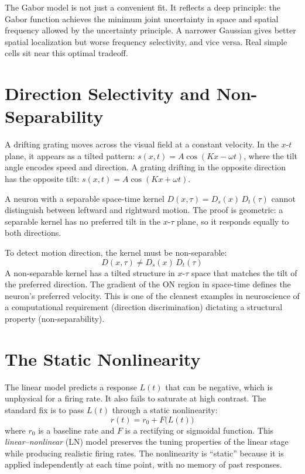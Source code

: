 The Gabor model is not just a convenient fit. It reflects a deep principle: the Gabor function achieves the minimum joint uncertainty in space and spatial frequency allowed by the uncertainty principle. A narrower Gaussian gives better spatial localization but worse frequency selectivity, and vice versa. Real simple cells sit near this optimal tradeoff.

\section{Direction Selectivity and Non-Separability}
\label{sec:direction}

A drifting grating moves across the visual field at a constant velocity. In the $x$-$t$ plane, it appears as a tilted pattern: $s(x, t) = A\cos(Kx - \omega t)$, where the tilt angle encodes speed and direction. A grating drifting in the opposite direction has the opposite tilt: $s(x, t) = A\cos(Kx + \omega t)$.

A neuron with a separable space-time kernel $D(x, \tau) = D_s(x)\,D_t(\tau)$ cannot distinguish between leftward and rightward motion. The proof is geometric: a separable kernel has no preferred tilt in the $x$-$\tau$ plane, so it responds equally to both directions.

To detect motion direction, the kernel must be non-separable:
%
\begin{equation}
  D(x, \tau) \neq D_s(x)\,D_t(\tau)
  \label{eq:non-separable}
\end{equation}
%
A non-separable kernel has a tilted structure in $x$-$\tau$ space that matches the tilt of the preferred direction. The gradient of the ON region in space-time defines the neuron's preferred velocity. This is one of the cleanest examples in neuroscience of a computational requirement (direction discrimination) dictating a structural property (non-separability).

\section{The Static Nonlinearity}
\label{sec:static-nonlinearity}

The linear model predicts a response $L(t)$ that can be negative, which is unphysical for a firing rate. It also fails to saturate at high contrast. The standard fix is to pass $L(t)$ through a static nonlinearity:
%
\begin{equation}
  r(t) = r_0 + F\bigl(L(t)\bigr)
  \label{eq:ln-model}
\end{equation}
%
where $r_0$ is a baseline rate and $F$ is a rectifying or sigmoidal function. This \emph{linear--nonlinear} (LN) model preserves the tuning properties of the linear stage while producing realistic firing rates. The nonlinearity is ``static'' because it is applied independently at each time point, with no memory of past responses.

